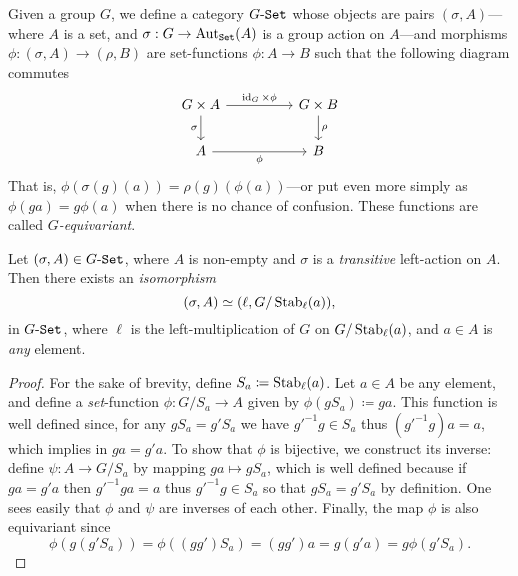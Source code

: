 \begin{definition}
    \label{def:G-set-category}
    Given a group \(G\), we define a category \({{G}\text{-}{\texttt{Set}}}\) whose objects are pairs
    \((\sigma, A)\)---where \(A\) is a set, and \(\sigma: G \to \operatorname{Aut}_{{\texttt{Set}}}(A)\)
    is a group action on \(A\)---and morphisms \(\phi: (\sigma, A) \to (\rho, B)\)
    are set-functions \(\phi: A \to B\) such that the following diagram commutes
    \[
        \begin{tikzcd}
            G \times A \ar[d, "\sigma"'] \ar[rr, "\Id_G \times \phi"]
            &&G \times B \ar[d, "\rho"] \\
            A \ar[rr, "\phi"'] &&B
        \end{tikzcd}
    \]
    That is, \(\phi(\sigma(g)(a)) = \rho(g)(\phi(a))\)---or put even more simply
    as \(\phi(g a) = g \phi(a)\) when there is no chance of confusion. These
    functions are called \emph{\(G\)-equivariant}.
\end{definition}

\begin{proposition}
    \label{prop:transitive-G-set-iso-left-mul-G/Stab}
    Let \((\sigma, A) \in {{G}\text{-}{\texttt{Set}}}\), where \(A\) is non-empty and \(\sigma\)
    is a \emph{transitive} left-action on \(A\). Then there exists an
    \emph{isomorphism}
    \[
        (\sigma, A) \simeq (\ell, G/\operatorname{Stab}_{\ell}(a)),
    \]
    in \({{G}\text{-}{\texttt{Set}}}\), where \(\ell\) is the left-multiplication of \(G\)
    on \(G/\operatorname{Stab}_{\ell}(a)\), and \(a \in A\) is \emph{any} element.
\end{proposition}

\begin{proof}
    For the sake of brevity, define \(S_a \coloneq \operatorname{Stab}_{\ell}(a)\). Let
    \(a \in A\) be any element, and define a \emph{set}-function
    \(\phi: G/S_a \to A\) given by \(\phi(g S_a) \coloneq g a\). This function is
    well defined since, for any \(g S_a = g' S_a\) we have \(g'^{-1} g \in S_a\)
    thus \((g'^{-1} g) a = a\), which implies in \(g a = g' a\). To show that
    \(\phi\) is bijective, we construct its inverse: define \(\psi: A \to G/S_a\) by
    mapping \(g a \mapsto g S_a\), which is well defined because if \(g a = g' a\)
    then \(g'^{-1} g a = a\) thus \(g'^{-1} g \in S_a\) so that \(g S_a = g' S_a\)
    by definition. One sees easily that \(\phi\) and \(\psi\) are inverses of each
    other. Finally, the map \(\phi\) is also equivariant since
    \[
        \phi(g(g' S_a)) = \phi((g g') S_a) = (g g') a = g(g'a) = g \phi(g' S_a).
    \]
\end{proof}

